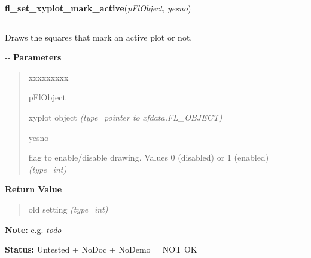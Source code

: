 \hspace{.8\funcindent}\begin{boxedminipage}{\funcwidth}

    \raggedright \textbf{fl\_set\_xyplot\_mark\_active}(\textit{pFlObject}, \textit{yesno})

    \vspace{-1.5ex}

    \rule{\textwidth}{0.5\fboxrule}
\setlength{\parskip}{2ex}

Draws the squares that mark an active plot or not.

-{}-
\setlength{\parskip}{1ex}
      \textbf{Parameters}
      \vspace{-1ex}

      \begin{quote}
        \begin{Ventry}{xxxxxxxxx}

          \item[pFlObject]


xyplot object
            {\it (type=pointer to xfdata.FL\_OBJECT)}

          \item[yesno]


flag to enable/disable drawing. Values 0 (disabled) or 1 (enabled)
            {\it (type=int)}

        \end{Ventry}

      \end{quote}

      \textbf{Return Value}
    \vspace{-1ex}

      \begin{quote}

old setting
      {\it (type=int)}

      \end{quote}

\textbf{Note:} 
e.g. \emph{todo}


\textbf{Status:} 
Untested + NoDoc + NoDemo = NOT OK


    \end{boxedminipage}

